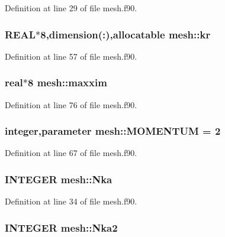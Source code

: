 Definition at line 29 of file mesh.f90.

\hypertarget{namespacemesh_a0eb10f03f0d716aafcb803855dff1b80}{
\subsubsection[{kr}]{\setlength{\rightskip}{0pt plus 5cm}REAL$\ast$8,dimension(:),allocatable {\bf mesh::kr}}}
\label{namespacemesh_a0eb10f03f0d716aafcb803855dff1b80}


Definition at line 57 of file mesh.f90.

\hypertarget{namespacemesh_aa7d7e6a7c12152ba29110facf1d664ce}{
\subsubsection[{maxxim}]{\setlength{\rightskip}{0pt plus 5cm}real$\ast$8 {\bf mesh::maxxim}}}
\label{namespacemesh_aa7d7e6a7c12152ba29110facf1d664ce}


Definition at line 76 of file mesh.f90.

\hypertarget{namespacemesh_a58029be857a15564e9ebaee23b4d887a}{
\subsubsection[{MOMENTUM}]{\setlength{\rightskip}{0pt plus 5cm}integer,parameter {\bf mesh::MOMENTUM} = 2}}
\label{namespacemesh_a58029be857a15564e9ebaee23b4d887a}


Definition at line 67 of file mesh.f90.

\hypertarget{namespacemesh_ab0bd6c4de110f0158d8a3aedd0be3907}{
\subsubsection[{Nka}]{\setlength{\rightskip}{0pt plus 5cm}INTEGER {\bf mesh::Nka}}}
\label{namespacemesh_ab0bd6c4de110f0158d8a3aedd0be3907}


Definition at line 34 of file mesh.f90.

\hypertarget{namespacemesh_abad69d3716a915fa710b7ba198f90f1b}{
\subsubsection[{Nka2}]{\setlength{\rightskip}{0pt plus 5cm}INTEGER {\bf mesh::Nka2}}}
\label{namespacemesh_abad69d3716a915fa710b7ba198f90f1b}


